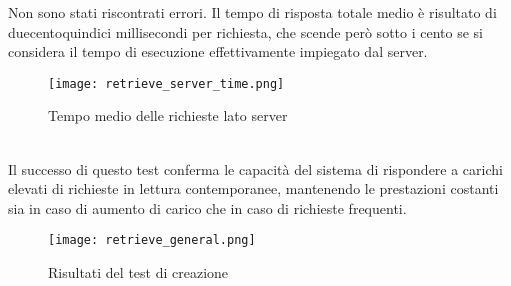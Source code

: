 Non sono stati riscontrati errori.
Il tempo di risposta totale medio è risultato di duecentoquindici millisecondi per richiesta,
che scende però sotto i cento se si considera il tempo di esecuzione effettivamente impiegato dal server.\\
\begin{figure}[htbp]
    \begin{center}
        \texttt{[image: retrieve\_server\_time.png]}
        \caption{Tempo medio delle richieste lato server}
    \end{center}
\end{figure}
\\
Il successo di questo test conferma le capacità del sistema 
di rispondere a carichi elevati di richieste in lettura contemporanee, 
mantenendo le prestazioni costanti sia in caso di aumento di carico che in caso di richieste frequenti.\\
\begin{figure}[htbp]
    \begin{center}
        \texttt{[image: retrieve\_general.png]}
        \caption{Risultati del test di creazione}
    \end{center}
\end{figure}
\\

